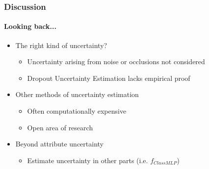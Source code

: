 \documentclass[9pt]{beamer}
\begin{document}
\begin{frame}
\frametitle{Discussion}
\framesubtitle{Looking back...}
\begin{itemize}
	\item The right kind of uncertainty?
	\begin{itemize}
		\item Uncertainty arising from noise or occlusions not considered
		\item Dropout Uncertainty Estimation lacks empirical proof
	\end{itemize}
	\item Other methods of uncertainty estimation%
	\begin{itemize}
		\item Often computationally expensive
		\item Open area of research
	\end{itemize}
	\item Beyond attribute uncertainty
	\begin{itemize}
		\item Estimate uncertainty in other parts (i.e. $f_{ClassMLP}$)
	\end{itemize}
\end{itemize}
\end{frame} 
\end{document}
